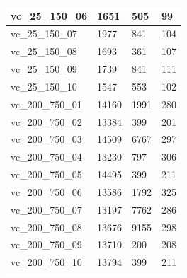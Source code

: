 \documentclass[11pt]{article}
\begin{document}
\begin{table}[!ht]
\begin{tabular}{|l|l|l|l|}
        vc\_25\_150\_06 & 1651 & 505 & 99 \\ \hline
        vc\_25\_150\_07 & 1977 & 841 & 104 \\ \hline
        vc\_25\_150\_08 & 1693 & 361 & 107 \\ \hline
        vc\_25\_150\_09 & 1739 & 841 & 111 \\ \hline
        vc\_25\_150\_10 & 1547 & 553 & 102 \\ \hline
        vc\_200\_750\_01 & 14160 & 1991 & 280 \\ \hline
        vc\_200\_750\_02 & 13384 & 399 & 201 \\ \hline
        vc\_200\_750\_03 & 14509 & 6767 & 297 \\ \hline
        vc\_200\_750\_04 & 13230 & 797 & 306 \\ \hline
        vc\_200\_750\_05 & 14495 & 399 & 211 \\ \hline
        vc\_200\_750\_06 & 13586 & 1792 & 325 \\ \hline
        vc\_200\_750\_07 & 13197 & 7762 & 286 \\ \hline
        vc\_200\_750\_08 & 13676 & 9155 & 298 \\ \hline
        vc\_200\_750\_09 & 13710 & 200 & 208 \\ \hline
        vc\_200\_750\_10 & 13794 & 399 & 211 \\ \hline
    \end{tabular}
\end{table}

\pagebreak
\end{document}
